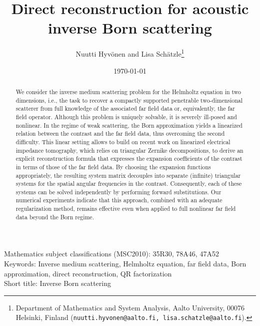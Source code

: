 \documentclass[11pt,a4paper]{article}
\theoremstyle{definition}
\theoremstyle{remark} \newtheorem{remark}[theorem]{Remark}
\numberwithin{equation}{section}
\numberwithin{figure}{section}
\numberwithin{algorithm}{section}
\numberwithin{table}{section}
\begin{document}
\title{Direct reconstruction for acoustic inverse Born scattering}  
\author{Nuutti Hyvönen and Lisa Sch\"atzle\footnote{Department of Mathematics and System Analysis, Aalto University, 00076 Helsinki, Finland ({\tt nuutti.hyvonen@aalto.fi, lisa.schatzle@aalto.fi}).}
}
\date{\today}

\maketitle

\begin{abstract}
We consider the inverse medium scattering problem for the Helmholtz equation in two dimensions, i.e., the task to recover a compactly supported penetrable two-dimensional scatterer
from full knowledge of the associated far field data or, equivalently, the far field operator.
Although this problem is uniquely solvable, it is severely ill-posed 
and nonlinear.
In the regime of weak scattering, the Born approximation yields a linearized relation between the contrast and the far field data, thus overcoming the second difficulty. This linear setting allows to build on recent work on linearized electrical impedance tomography, which relies on triangular Zernike decompositions, to derive an explicit reconstruction formula that expresses the expansion coefficients of the contrast in terms of those of the far field data.
By choosing the expansion functions appropriately, the resulting system matrix decouples into separate (infinite) triangular systems for the spatial angular frequencies in the contrast.
Consequently, each of these systems can be solved independently by performing forward substitutions.
Our numerical experiments indicate that this approach, combined with an adequate regularization method, remains effective even when applied to full nonlinear far field data beyond the Born regime.
\end{abstract}


{\small\noindent
  Mathematics subject classifications (MSC2010):
  35R30,  %
  78A46, %
  47A52 %
  \\\noindent 
  Keywords: Inverse medium scattering, Helmholtz equation,
  far field data, Born approximation, direct reconstruction, QR factorization
  \\\noindent
  Short title: Inverse Born scattering
}
\end{document}

